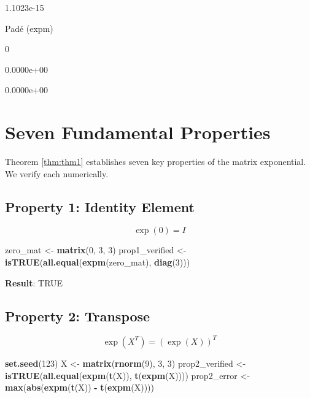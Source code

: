 \documentclass[
]{book}
\newenvironment{Shaded}{\begin{snugshade}}{\end{snugshade}}
\newcommand{\DecValTok}[1]{\textcolor[rgb]{0.00,0.00,0.81}{#1}}
\newcommand{\FunctionTok}[1]{\textcolor[rgb]{0.13,0.29,0.53}{\textbf{#1}}}
\newcommand{\NormalTok}[1]{#1}
\newcommand{\OtherTok}[1]{\textcolor[rgb]{0.56,0.35,0.01}{#1}}
\newcommand{\SpecialCharTok}[1]{\textcolor[rgb]{0.81,0.36,0.00}{\textbf{#1}}}
\theoremstyle{definition}
\theoremstyle{definition}
\theoremstyle{definition}
\theoremstyle{definition}
\theoremstyle{remark}
\begin{document}
1.1023e-15

Padé (expm)

0

0.0000e+00

0.0000e+00

\section{Seven Fundamental Properties}\label{seven-fundamental-properties}

Theorem \ref{thm:thm1} establishes seven key properties of the matrix exponential. We verify each numerically.

\subsection{Property 1: Identity Element}\label{property-1-identity-element}

\[\exp(0) = I\]

\begin{Shaded}
\begin{Highlighting}[]
\NormalTok{zero\_mat }\OtherTok{\textless{}{-}} \FunctionTok{matrix}\NormalTok{(}\DecValTok{0}\NormalTok{, }\DecValTok{3}\NormalTok{, }\DecValTok{3}\NormalTok{)}
\NormalTok{prop1\_verified }\OtherTok{\textless{}{-}} \FunctionTok{isTRUE}\NormalTok{(}\FunctionTok{all.equal}\NormalTok{(}\FunctionTok{expm}\NormalTok{(zero\_mat), }\FunctionTok{diag}\NormalTok{(}\DecValTok{3}\NormalTok{)))}
\end{Highlighting}
\end{Shaded}

\textbf{Result}: TRUE

\subsection{Property 2: Transpose}\label{property-2-transpose}

\[\exp(X^T) = (\exp(X))^T\]

\begin{Shaded}
\begin{Highlighting}[]
\FunctionTok{set.seed}\NormalTok{(}\DecValTok{123}\NormalTok{)}
\NormalTok{X }\OtherTok{\textless{}{-}} \FunctionTok{matrix}\NormalTok{(}\FunctionTok{rnorm}\NormalTok{(}\DecValTok{9}\NormalTok{), }\DecValTok{3}\NormalTok{, }\DecValTok{3}\NormalTok{)}
\NormalTok{prop2\_verified }\OtherTok{\textless{}{-}} \FunctionTok{isTRUE}\NormalTok{(}\FunctionTok{all.equal}\NormalTok{(}\FunctionTok{expm}\NormalTok{(}\FunctionTok{t}\NormalTok{(X)), }\FunctionTok{t}\NormalTok{(}\FunctionTok{expm}\NormalTok{(X))))}
\NormalTok{prop2\_error }\OtherTok{\textless{}{-}} \FunctionTok{max}\NormalTok{(}\FunctionTok{abs}\NormalTok{(}\FunctionTok{expm}\NormalTok{(}\FunctionTok{t}\NormalTok{(X)) }\SpecialCharTok{{-}} \FunctionTok{t}\NormalTok{(}\FunctionTok{expm}\NormalTok{(X))))}
\end{Highlighting}
\end{Shaded}
\end{document}
